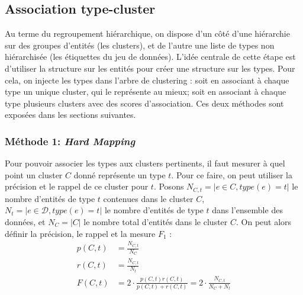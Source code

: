 



\subsection{Association type-cluster}
\label{subsec:te-mapping}


Au terme du regroupement hiérarchique, on dispose d'un côté d'une hiérarchie sur des groupes d'entités (les clusters), et de l'autre une liste de types non hiérarchisée (les étiquettes du jeu de données). L'idée centrale de cette étape est d'utiliser la structure sur les entités pour créer une structure sur les types. Pour cela, on injecte les types dans l'arbre de clustering : soit en associant à chaque type un unique cluster, qui le représente au mieux; soit en associant à chaque type plusieurs clusters avec des scores d'association. Ces deux méthodes sont exposées dans les sections suivantes.




\subsubsection{Méthode 1: \textit{Hard Mapping}}
\label{ssubsec:te-hardmapping}

Pour pouvoir associer les types aux clusters pertinents, il faut mesurer à quel point un cluster $C$ donné représente un type $t$. Pour ce faire, on peut utiliser la précision et le rappel de ce cluster pour $t$. Posons $N_{C,t} = | e \in C, type(e) = t|$ le nombre d'entités de type $t$ contenues dans le cluster $C$,
$N_t = |e \in \mathcal{D}, type(e) = t|$ le nombre d'entités de type $t$ dans l'ensemble des données, et $N_C = | C |$ le nombre total d'entités dans le cluster $C$. On peut alors définir la précision, le rappel et la mesure $F_1$ :
\begin{align}
    p(C, t) &= \frac{N_{C, t}}{N_C} \\
    r(C, t) &= \frac{N_{C, t}}{N_t} \\
    F(C, t) &= 2 \cdot \frac{p(C, t)r(C, t)}{p(C, t) + r(C, t)} = 2 \cdot \frac{N_{C,t}}{N_C + N_t}
\end{align}

